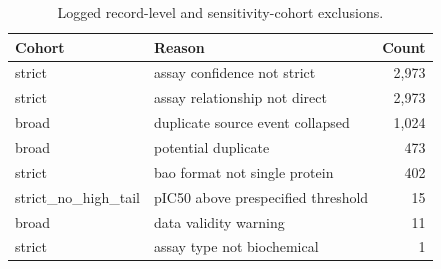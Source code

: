 \begin{table}[H]
\centering
\caption{Logged record-level and sensitivity-cohort exclusions.}
\label{tab:curation-exclusions}
\small
\begin{tabular}{L{0.20\textwidth}L{0.56\textwidth}r}
\toprule
\textbf{Cohort} & \textbf{Reason} & \textbf{Count} \\
\midrule
strict & assay confidence not strict & 2,973 \\
strict & assay relationship not direct & 2,973 \\
broad & duplicate source event collapsed & 1,024 \\
broad & potential duplicate & 473 \\
strict & bao format not single protein & 402 \\
strict\_no\_high\_tail & pIC50 above prespecified threshold & 15 \\
broad & data validity warning & 11 \\
strict & assay type not biochemical & 1 \\
\bottomrule
\end{tabular}
\end{table}
